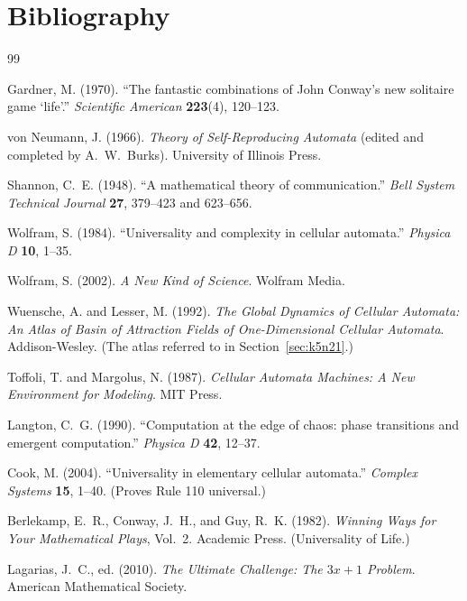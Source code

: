 \chapter*{Bibliography}

\begin{thebibliography}{99}

 Gardner, M. (1970).
  ``The fantastic combinations of John Conway's new solitaire game
  `life'.'' \emph{Scientific American} \textbf{223}(4), 120--123.

 von Neumann, J. (1966).
  \emph{Theory of Self-Reproducing Automata} (edited and completed by
  A.~W.~Burks). University of Illinois Press.

 Shannon, C.~E. (1948).
  ``A mathematical theory of communication.''
  \emph{Bell System Technical Journal} \textbf{27}, 379--423 and
  623--656.

 Wolfram, S. (1984).
  ``Universality and complexity in cellular automata.''
  \emph{Physica D} \textbf{10}, 1--35.

 Wolfram, S. (2002).
  \emph{A New Kind of Science}. Wolfram Media.

 Wuensche, A. and Lesser, M. (1992).
  \emph{The Global Dynamics of Cellular Automata: An Atlas of Basin of
  Attraction Fields of One-Dimensional Cellular Automata}.
  Addison-Wesley. (The atlas referred to in Section~\ref{sec:k5n21}.)

 Toffoli, T. and Margolus, N. (1987).
  \emph{Cellular Automata Machines: A New Environment for Modeling}.
  MIT Press.

 Langton, C.~G. (1990).
  ``Computation at the edge of chaos: phase transitions and emergent
  computation.'' \emph{Physica D} \textbf{42}, 12--37.

 Cook, M. (2004).
  ``Universality in elementary cellular automata.''
  \emph{Complex Systems} \textbf{15}, 1--40. (Proves Rule 110
  universal.)

 Berlekamp, E.~R., Conway, J.~H., and Guy,
  R.~K. (1982). \emph{Winning Ways for Your Mathematical Plays},
  Vol.~2. Academic Press. (Universality of Life.)

 Lagarias, J.~C., ed. (2010).
  \emph{The Ultimate Challenge: The $3x+1$ Problem}.
  American Mathematical Society.


\end{thebibliography}
